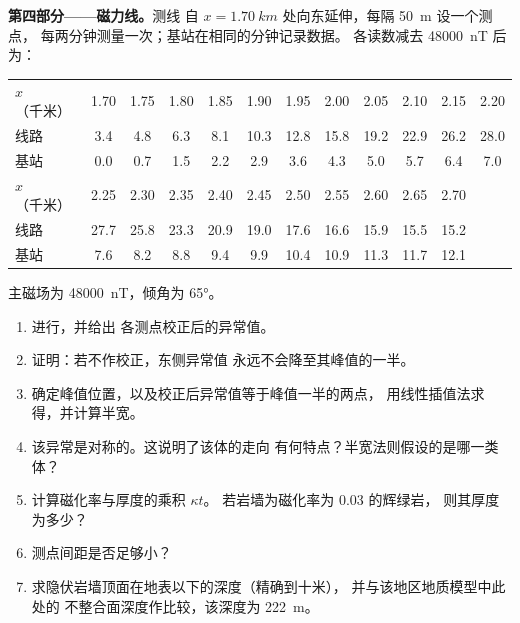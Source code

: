 \begin{problem}
\medskip\noindent\textbf{第四部分——磁力线。}测线
自 $x = \qty{1.70}{km}$ 处向东延伸，每隔 \qty{50}{m} 设一个测点，
每两分钟测量一次；基站在相同的分钟记录数据。
各读数减去 \qty{48000}{nT} 后为：
\begin{center}
\small
\setlength{\tabcolsep}{3.5pt}
\begin{tabular}{lccccccccccc}
\hline
$x$（千米） & 1.70 & 1.75 & 1.80 & 1.85 & 1.90 & 1.95 & 2.00 & 2.05 & 2.10 & 2.15 & 2.20 \\
线路 & 3.4 & 4.8 & 6.3 & 8.1 & 10.3 & 12.8 & 15.8 & 19.2 & 22.9 & 26.2 & 28.0 \\
基站 & 0.0 & 0.7 & 1.5 & 2.2 & 2.9 & 3.6 & 4.3 & 5.0 & 5.7 & 6.4 & 7.0 \\
\hline
$x$（千米） & 2.25 & 2.30 & 2.35 & 2.40 & 2.45 & 2.50 & 2.55 & 2.60 & 2.65 & 2.70 & \\
线路 & 27.7 & 25.8 & 23.3 & 20.9 & 19.0 & 17.6 & 16.6 & 15.9 & 15.5 & 15.2 & \\
基站 & 7.6 & 8.2 & 8.8 & 9.4 & 9.9 & 10.4 & 10.9 & 11.3 & 11.7 & 12.1 & \\
\hline
\end{tabular}
\end{center}
主磁场为 \qty{48000}{nT}，倾角为 \ang{65}。
\begin{enumerate}[resume]
\item 进行，并给出
  各测点校正后的异常值。
\item 证明：若不作校正，东侧异常值
  永远不会降至其峰值的一半。
\item 确定峰值位置，以及校正后异常值等于峰值一半的两点，
  用线性插值法求得，并计算半宽。
\item 该异常是对称的。这说明了该体的走向
  有何特点？半宽法则假设的是哪一类体？
\item 计算磁化率与厚度的乘积 $\kappa t$。
  若岩墙为磁化率为 \num{0.03} 的辉绿岩，
  则其厚度为多少？
\item 测点间距是否足够小？
\item 求隐伏岩墙顶面在地表以下的深度（精确到十米），
  并与该地区地质模型中此处的
  不整合面深度作比较，该深度为
  \qty{222}{m}。
\end{enumerate}
\end{problem}
